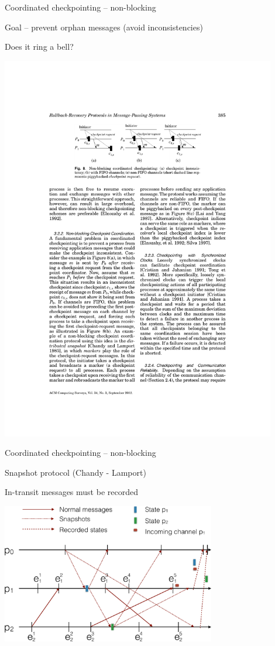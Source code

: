 \begin{frame}{Coordinated checkpointing --  non-blocking}
\BI
\item Goal – prevent orphan messages (avoid inconsistencies)
\item Does it ring a bell?
\EI

\bigskip
\begin{center}
\includegraphics[width=0.9\textwidth]{nonblocking}
\end{center}


\end{frame}


\begin{frame}{Coordinated checkpointing --  non-blocking}
\BI
\item Snapshot protocol (Chandy - Lamport)
\item In-transit messages must be recorded
\EI

\bigskip
\begin{center}
\includegraphics[width=0.7\textwidth]{figs/03/diagram9}
\end{center}

\end{frame}

